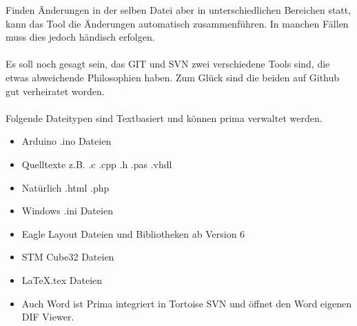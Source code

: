 Finden Änderungen in der selben Datei aber in unterschiedlichen Bereichen statt, kann das Tool die Änderungen automatisch zusammenführen. In manchen Fällen muss dies jedoch händisch erfolgen.\\
\ \\
Es soll noch gesagt sein, das GIT und SVN zwei verschiedene Tools sind, die etwas abweichende Philosophien haben. Zum Glück sind die beiden auf Github gut verheiratet worden.\\
\ \\
Folgende Dateitypen sind Textbasiert und können prima verwaltet werden.
\begin{itemize}
\item Arduino .ino Dateien
\item Quelltexte z.B. .c .cpp .h .pas .vhdl
\item Natürlich .html .php
\item Windows .ini Dateien
\item Eagle Layout Dateien und Bibliotheken ab Version 6
\item STM Cube32 Dateien
\item \LaTeX .tex Dateien
\item Auch Word ist Prima integriert in Tortoise SVN und öffnet den Word eigenen DIF Viewer.
\end{itemize}


  





